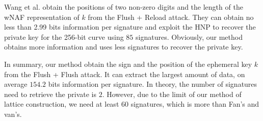 Wang et al. \cite{Wang2017} obtain the positions of two non-zero digits and the length of the wNAF representation of $k$ from the Flush + Reload attack.
They can obtain no less than 2.99 bits information per signature and exploit the HNP to recover the private key for the 256-bit curve using $85$ signatures.
Obviously, our method obtains more information and uses less signatures to recover the private key.

In summary, our method obtain the sign and the position of the ephemeral key $k$ from the Flush + Flush attack. 
It can extract the largest amount of data, on average $154.2$ bits information per signature.
In theory, the number of signatures need to retrieve the private is $2$.
  However, due to the limit of our method of lattice construction, we need at least $60$ signatures, which is more than Fan's and van's.
   





























